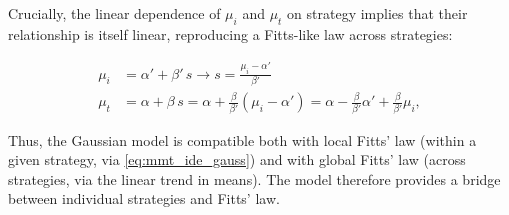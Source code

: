 \documentclass[acmlarge, manuscript,review]{acmart}
\newcommand{\mmt}{\ensuremath{\overline{\mt}}\xspace}
\newcommand{\mt}{\ensuremath{{\text{MT}}}\xspace}
\newcommand{\ide}{\ensuremath{{\text{ID}_e}}\xspace}
\begin{document}
Crucially, the linear dependence of $\mu_i$ and $\mu_t$ on strategy implies that their relationship is itself linear, reproducing a Fitts-like law across strategies:


\begin{align}
	\mu_i & = \alpha' + \beta'\,s  \longrightarrow s =  \frac{\mu_i - \alpha'}{\beta'} \\
	\mu_t & = \alpha + \beta\,s = \alpha + \frac{\beta}{\beta'} (\mu_i - \alpha')  = \alpha - \frac{\beta}{\beta'}\alpha' + \frac{\beta}{\beta'}\mu_i,
\end{align}

Thus, the Gaussian model is compatible both with local Fitts' law (within a given strategy, via \autoref{eq:mmt_ide_gauss}) and with global Fitts' law (across strategies, via the linear trend in means). The model therefore provides a bridge between individual strategies and Fitts' law.



\end{document}

